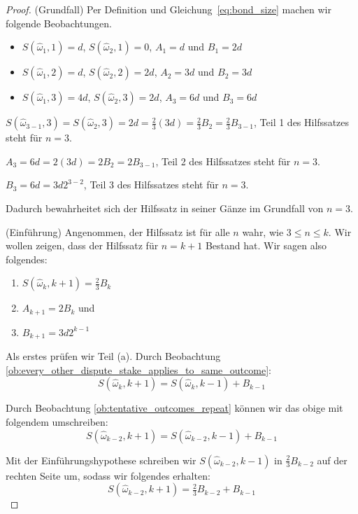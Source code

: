\documentclass[floatfix,reprint,nofootinbib,amsmath,amssymb,epsfig,pre,floats,letterpaper,groupedaffiliation]{revtex4-1}
\theoremstyle{definition}
\theoremstyle{definition}
\theoremstyle{definition}
\begin{document}
\begin{appendix}
\begin{proof}
(Grundfall)
Per Definition und Gleichung~\ref{eq:bond_size} machen wir folgende Beobachtungen.

\begin{itemize}
\item{$S(\hat{\omega}_{1},1)=d$, $S(\hat{\omega}_{2},1)=0$, $A_{1}=d$ und $B_{1}=2d$}
\item{$S(\hat{\omega}_{1},2)=d$, $S(\hat{\omega}_{2},2)=2d$, $A_{2}=3d$ und $B_{2}=3d$}
\item{$S(\hat{\omega}_{1},3)=4d$, $S(\hat{\omega}_{2},3)=2d$, $A_{3}=6d$ und $B_{3}=6d$}
\end{itemize}

$S(\hat{\omega}_{3-1},3)=S(\hat{\omega}_{2},3)=2d=\frac{2}{3}(3d)=\frac{2}{3}B_{2}=\frac{2}{3}B_{3-1}$, Teil 1 des Hilfssatzes steht für $n=3$.

$A_{3}=6d=2(3d)=2B_{2}=2B_{3-1}$, Teil 2 des Hilfssatzes steht für $n=3$.

$B_{3}=6d=3d2^{3-2}$, Teil 3 des Hilfssatzes steht für $n=3$.

\vspace{4mm}

Dadurch bewahrheitet sich der Hilfssatz in seiner Gänze im Grundfall von $n=3$.

\vspace{4mm}

(Einführung)
Angenommen, der Hilfssatz ist für alle $n$ wahr, wie $3 \leq n \leq k$. Wir wollen zeigen, dass der Hilfssatz für $n=k+1$ Bestand hat. Wir sagen also folgendes:

\begin{enumerate}[label=(\alph*)]
\item{$S(\hat{\omega}_{k},k+1)=\frac{2}{3}B_{k}$}
\item{$A_{k+1}=2B_{k}$ und}
\item{$B_{k+1}=3d2^{k-1}$}
\end{enumerate}

Als erstes prüfen wir Teil (a). Durch Beobachtung \ref{ob:every_other_dispute_stake_applies_to_same_outcome}:
\[ S(\hat{\omega}_{k},k+1)=S(\hat{\omega}_{k},k-1)+B_{k-1} \]

Durch Beobachtung \ref{ob:tentative_outcomes_repeat} können wir das obige mit folgendem umschreiben:
\[ S(\hat{\omega}_{k-2},k+1)=S(\hat{\omega}_{k-2},k-1)+B_{k-1} \]

Mit der Einführungshypothese schreiben wir $S(\hat{\omega}_{k-2},k-1)$ in $\frac{2}{3}B_{k-2}$ auf der rechten Seite um, sodass wir folgendes erhalten:
\[ S(\hat{\omega}_{k-2},k+1)=\tfrac{2}{3}B_{k-2}+B_{k-1} \]


\end{proof}
\end{appendix}
\end{document}
